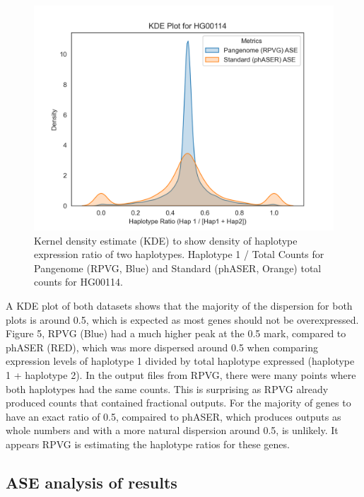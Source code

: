 \documentclass{article}
\begin{document}
\begin{figure}[htbp]
  \centering
  \includegraphics[width=0.8\linewidth]{HG00114_PAN_MAGE_kdeplot.png}
  \caption{Kernel density estimate (KDE) to show density of haplotype expression ratio of two 
  haplotypes. Haplotype 1 / Total Counts for Pangenome (RPVG, Blue) and Standard (phASER, Orange) total counts for HG00114.}
\end{figure}  

A KDE plot of both datasets shows that the majority of the dispersion for both plots is 
around 0.5, which is expected as most genes should not be overexpressed. Figure 5, RPVG (Blue) had a much higher peak at
the 0.5 mark, compared to phASER (RED), which was more dispersed around 0.5 when comparing expression levels of 
haplotype 1 divided by total haplotype expressed (haplotype 1 + haplotype 2). In the output files from RPVG,
there were many points where both haplotypes had the same counts. This is surprising as
RPVG already produced counts that contained fractional outputs. For the majority of genes
to have an exact ratio of 0.5, compaired to phASER, which produces outputs as whole numbers and with a 
more natural dispersion around 0.5, is unlikely. It appears RPVG is estimating the haplotype ratios for these genes.

\subsection{ASE analysis of results}
\end{document}
